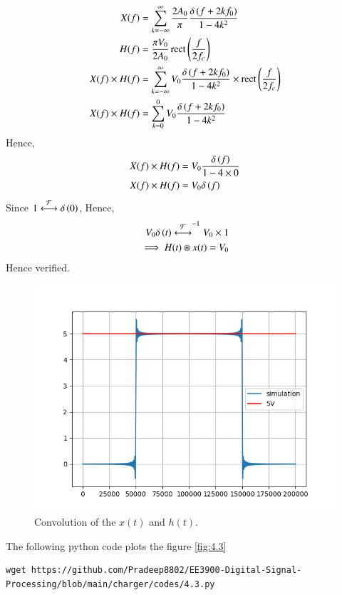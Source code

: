 \documentclass[journal,12pt,twocolumn]{IEEEtran}
\renewcommand\thesection{\arabic{section}}
\begin{document}
\begin{enumerate}[label=\thesection.\arabic*
	,ref=\thesection.\theenumi]
	\begin{align}
		X(f)&=\sum_{k=-\infty}^{\infty} \frac{2A_0}{\pi} \frac{\delta\left(f+2kf_0\right)}{1-4k^2}\\
		H(f)&=\frac{\pi V_0}{2A_0}\mathop{\mathrm{rect}}{\left(\frac{f}{2f_c}\right)}\\
		X(f) \times H(f)&=\sum_{k=-\infty}^{\infty} V_0 \frac{\delta\left(f+2kf_0\right)}{1-4k^2} \times \mathop{\mathrm{rect}}{\left(\frac{f}{2f_c}\right)}\\
		X(f)\times H(f)&=\sum_{k=0}^{0} V_0 \frac{\delta\left(f+2kf_0\right)}{1-4k^2}
	\end{align} 
	Hence,
	\begin{align}
		X(f)\times H(f)&=V_0 \frac{\delta\left(f\right)}{1-4 \times 0}\\
		X(f)\times H(f)&=V_0 \delta\left(f\right)
	\end{align} 
Since $1\overset{\mathcal{F}}{ \longleftrightarrow} \delta\left(0\right)$,
Hence, 
\begin{align}
V_0 \delta\left(t\right) \overset{\mathcal{F}}{ \longleftrightarrow}^{-1} V_0\times 1	\\
\implies H(t) \circledast x(t)=V_0
\end{align}
Hence verified.
	\begin{figure}[!ht]
			\includegraphics[width=\columnwidth]{figs/4.3.png}
			\caption{Convolution of the $x(t)$ and $h(t)$.}
			\label{eq:fig:4.3}
		\end{figure}
The following python code plots the figure \ref{fig:4.3}
\begin{lstlisting}
wget https://github.com/Pradeep8802/EE3900-Digital-Signal-Processing/blob/main/charger/codes/4.3.py
\end{lstlisting} 
\end{enumerate}
\end{document}
